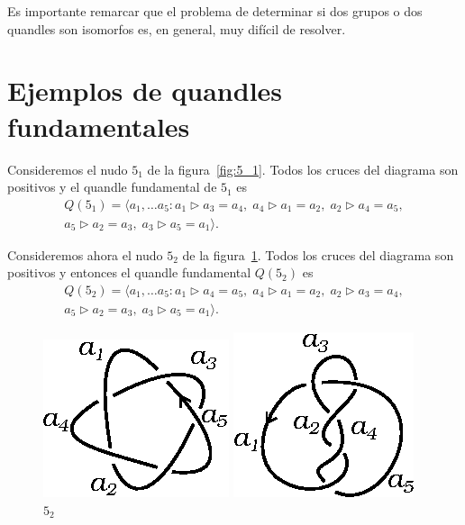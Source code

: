 \documentclass[graybox]{svmult}
\begin{document}
	Es importante remarcar que el problema de determinar si dos grupos o dos
	quandles son isomorfos es, en general, muy difícil de resolver.

\section{Ejemplos de quandles fundamentales}

	\label{block:5_1:fundamental_quandle}
	\label{block:5_2:fundamental_quandle}

    Consideremos el nudo $5_1$ de la figura~\ref{fig:5_1}. Todos los cruces del
    diagrama son positivos y el quandle fundamental de $5_1$ es
	\begin{multline}
        \label{eq:5_1}
        Q(5_1)=\langle a_1,\dots a_5:
		a_1\triangleright a_3=a_4,\;
        a_4\triangleright a_1=a_2,\;
        a_2\triangleright a_4=a_5,\\
        a_5\triangleright a_2=a_3,\; 
        a_3\triangleright a_5=a_1\rangle.
    \end{multline}

    Consideremos ahora el nudo $5_2$ de la figura~\ref{fig:5_2}. Todos los
    cruces del diagrama son positivos y entonces el quandle fundamental
    $Q(5_2)$ es
	\begin{multline}
        Q(5_2)=\langle a_1,\dots a_5:
		a_1\triangleright a_4=a_5,\;
		a_4\triangleright a_1=a_2,\;
		a_2\triangleright a_3=a_4,\\
		a_5\triangleright a_2=a_3,\;
		a_3\triangleright a_5=a_1\rangle.
	\end{multline}

	\begin{figure}[ht]
		\centering
		\begin{minipage}{0.4\textwidth}
			\centering
			\includegraphics[scale=0.7]{images/5_1}
			\caption{$5_1$}
			\label{fig:5_1}
		\end{minipage}
		\begin{minipage}{0.4\textwidth}
			\centering
			\includegraphics[scale=0.7]{images/5_2}
			\caption{$5_2$}
			\label{fig:5_2}
		\end{minipage}
	\end{figure}
\end{document}
